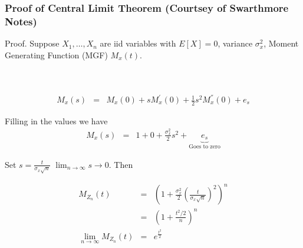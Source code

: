 \documentclass{beamer}
\numberwithin{equation}{section}
\begin{document}
\begin{frame}
\frametitle{Proof of Central Limit Theorem (Courtsey of Swarthmore Notes)}

\large{Proof.}
Suppose $X_{1}, \hdots, X_{n}$ are iid variables with $E[X] = 0 $, variance $\sigma^{2}_{x}$, Moment Generating Function (MGF) $M_{x}(t)$. \pause  \\

 \pause \\
 \pause \\

\end{frame}


\begin{frame}
\begin{eqnarray}
M_{x} (s) & = & M_{x} (0)  + s M^{'}_{x}(0) + \frac{1}{2} s^2 M_{x}^{''}(0) + e_{s} \nonumber 
\end{eqnarray}

Filling  in the values we have 
\begin{eqnarray}
M_{x} (s) & = & 1  + 0 + \frac{\sigma_{x}^{2}}{2} s^2  + \underbrace{e_{s}}_{\text{Goes to zero}} \nonumber 
\end{eqnarray}

Set $s = \frac{t}{\sigma_{x} \sqrt{n}} $ $\lim_{n\rightarrow \infty} s \rightarrow 0$.  Then 

\begin{eqnarray}
M_{Z_{n}}(t) & = & \left(1 + \frac{\sigma_{x}^{2}}{2}\left( \frac{t}{\sigma_{x} \sqrt{n}} \right)^{2} \right)^{n} \nonumber \\
& = & \left( 1 + \frac{t^{2}/2}{n} \right)^{n} \nonumber \\
\lim_{n\rightarrow \infty} M_{Z_{n}}(t) & = & e^{\frac{t^2}{2}}\nonumber 
\end{eqnarray}

\end{frame}
\end{document}
